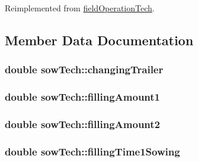 Reimplemented from \hyperlink{classfield_operation_tech_ab0b2bf71efca78b637837fc4d0e3a9d4}{fieldOperationTech}.

\subsection{Member Data Documentation}
\hypertarget{classsow_tech_a07d006768f330cee12e40f2349f545b1}{
\subsubsection[{changingTrailer}]{\setlength{\rightskip}{0pt plus 5cm}double {\bf sowTech::changingTrailer}}}
\label{classsow_tech_a07d006768f330cee12e40f2349f545b1}
\hypertarget{classsow_tech_a98b1760033ac01469be4a281608de249}{
\subsubsection[{fillingAmount1}]{\setlength{\rightskip}{0pt plus 5cm}double {\bf sowTech::fillingAmount1}}}
\label{classsow_tech_a98b1760033ac01469be4a281608de249}
\hypertarget{classsow_tech_a7cc699ce5d5c80c6e52b49340058f181}{
\subsubsection[{fillingAmount2}]{\setlength{\rightskip}{0pt plus 5cm}double {\bf sowTech::fillingAmount2}}}
\label{classsow_tech_a7cc699ce5d5c80c6e52b49340058f181}
\hypertarget{classsow_tech_a2cc7e4ca798b84613d391afdd10b329f}{
\subsubsection[{fillingTime1Sowing}]{\setlength{\rightskip}{0pt plus 5cm}double {\bf sowTech::fillingTime1Sowing}}}
